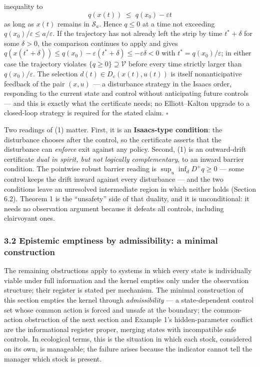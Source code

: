 \documentclass[11pt]{article}
\begin{document}
inequality to \[q(x(t)) \;\le\; q(x_0) - \varepsilon t\] as long as
\(x(t)\) remains in \(\mathcal{S}_a\). Hence \(q \le 0\) at a time not
exceeding \(q(x_0)/\varepsilon \le a/\varepsilon\). If the trajectory
has not already left the strip by time \(t^* + \delta\) for some
\(\delta > 0\), the comparison continues to apply and gives
\(q(x(t^* + \delta)) \le q(x_0) - \varepsilon(t^* + \delta) \le -\varepsilon\delta < 0\)
with \(t^* = q(x_0)/\varepsilon\); in either case the trajectory
violates \(\{ q \ge 0 \} \supseteq \mathcal{V}\) before every time
strictly larger than \(q(x_0)/\varepsilon\). The selection
\(d(t) \in D_\varepsilon(x(t), u(t))\) is itself nonanticipative
feedback of the pair \((x, u)\) --- a disturbance strategy in the Isaacs
order, responding to the current state and control without anticipating
future controls --- and this is exactly what the certificate needs; no
Elliott--Kalton upgrade to a closed-loop strategy is required for the
stated claim. \ensuremath{\square}

Two readings of (1) matter. First, it is an \textbf{Isaacs-type
condition}: the disturbance chooses after the control, so the
certificate asserts that the disturbance can \emph{enforce} exit against
any policy. Second, (1) is an outward-drift certificate \emph{dual in
spirit, but not logically complementary}, to an inward barrier
condition. The pointwise robust barrier reading is
\(\sup_u \inf_d D^+ q \ge 0\) --- some control keeps the drift inward
against every disturbance --- and the two conditions leave an unresolved
intermediate region in which neither holds (Section 6.2). Theorem 1 is
the ``unsafety'' side of that duality, and it is unconditional: it needs
no observation argument because it defeats all controls, including
clairvoyant ones.

\subsubsection{3.2 Epistemic emptiness by admissibility: a minimal
construction}\label{epistemic-emptiness-by-admissibility-a-minimal-construction}

The remaining obstructions apply to systems in which every state is
individually viable under full information and the kernel empties only
under the observation structure; their register is stated per mechanism.
The minimal construction of this section empties the kernel through
\emph{admissibility} --- a state-dependent control set whose common
action is forced and unsafe at the boundary; the common-action
obstruction of the next section and Example 1's hidden-parameter
conflict are the informational register proper, merging states with
incompatible safe controls. In ecological terms, this is the situation
in which each stock, considered on its own, is manageable; the failure
arises because the indicator cannot tell the manager which stock is
present.
\end{document}
